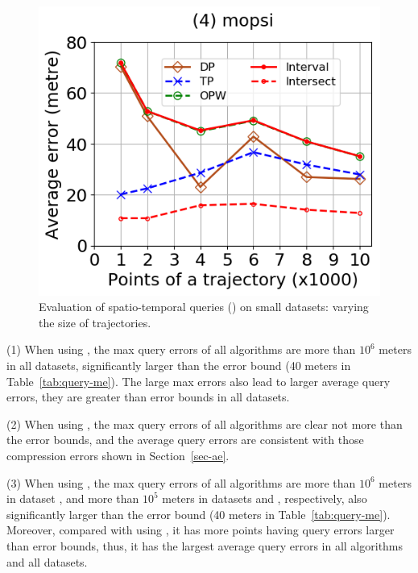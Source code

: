 \begin{figure}[tb!]
	\includegraphics[scale=0.320]{Figures/Exp-query-DAD-error-size-mopsi.png}	
	\vspace{-2ex}
	\caption{\small Evaluation of spatio-temporal queries (\dad) on small datasets: varying the size of trajectories.}
	\label{fig:query-dad-size}
	\vspace{-2ex}
\end{figure}




\ni (1) When using \ped, the max query errors of all algorithms are more than $10^6$ meters in all datasets, significantly larger than the error bound (40 meters in Table~\ref{tab:query-me}). The large max errors also lead to larger average query errors, \ie they are greater than error bounds in all datasets.


\ni (2) When using \sed, the max query errors of all algorithms are clear not more than the error bounds, and the average query errors are consistent with those compression errors shown in Section~\ref{sec-ae}.
	

\ni (3) When using \dad, the max query errors of all algorithms are more than $10^6$ meters in dataset \ucar, and more than $10^5$ meters in datasets \geolife and \mopsi, respectively, also significantly larger than the error bound (40 meters in Table~\ref{tab:query-me}). Moreover, compared with using \ped, it has more points having query errors larger than error bounds, thus, it has the largest average query errors in all algorithms and all datasets.


